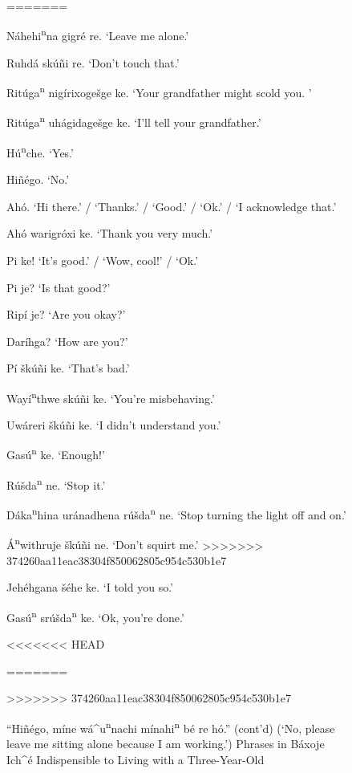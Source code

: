 \documentclass[output=paper]{LSP/langsci}
\begin{document}
\begin{figure}[p]
\begin{list}{}{}
=======
\item{N\'ahehi\textsuperscript{n}na gigr\'e re. `Leave me alone.'}
\item{Ruhd\'a sk\'u\~ni re. `Don't touch that.'}
\item{Rit\'uga\textsuperscript{n} nig\'irixoge\v{s}ge ke. `Your grandfather might scold you. '}
\item{Rit\'uga\textsuperscript{n} uh\'agidage\v{s}ge ke. `I'll tell your grandfather.'}
\item{}
\item{H\'u\textsuperscript{n}che.	`Yes.'}
\item{Hi\~n\'ego. `No.'}
\item{Ah\'o.	`Hi there.' / `Thanks.' / `Good.' / `Ok.' / `I acknowledge that.'}
\item{Ah\'o warigróxi ke. `Thank you very much.'}
\item{Pi ke! `It's good.' / `Wow, cool!' / `Ok.'}
\item{Pi je? `Is that good?'}
\item{Rip\'i je? `Are you okay?'}
\item{Dar\'ihga? `How are you?'}
\item{P\'i \v{s}k\'u\~ni ke. `That's bad.'}
\item{Way\'i\textsuperscript{n}thwe sk\'u\~ni ke. `You're misbehaving.'}
\item{Uw\'areri \v{s}k\'u\~ni ke. `I didn't understand you.'}
\item{Gas\'u\textsuperscript{n} ke. `Enough!'}
\item{R\'u\v{s}da\textsuperscript{n} ne. `Stop it.'}
\item{D\'aka\textsuperscript{n}hina ur\'anadhena r\'u\v{s}da\textsuperscript{n} ne. `Stop turning the light off and on.'}
\item{\'A\textsuperscript{n}withruje šk\'u\~ni ne. `Don't squirt me.'}
>>>>>>> 374260aa11eac38304f850062805c954c530b1e7
\item{}
\item{Jeh\'ehgana \v{s}\'ehe ke. `I told you so.'}
\item{Gas\'u\textsuperscript{n} sr\'u\v{s}da\textsuperscript{n} ke. `Ok, you're done.'}
\end{list} 
<<<<<<< HEAD
\caption{``Hiñ\'ego, míne wá\^{ }u\textsuperscript{n}nachi mínahi\textsuperscript{n} b\'e re hó.'' (cont'd)\newline
(`No, please leave me sitting alone because I am working.')\newline
Phrases in Báxoje Ich\^{ }\'e Indispensible to Living with a Three-Year-Old}
=======
\caption{``Hi\~n\'ego, m\'ine w\'a\^{ }u\textsuperscript{n}nachi m\'inahi\textsuperscript{n} b\'e re h\'o.'' (cont'd)\newline
(`No, please leave me sitting alone because I am working.')\newline
Phrases in B\'axoje Ich\^{ }\'e Indispensible to Living with a Three-Year-Old}
>>>>>>> 374260aa11eac38304f850062805c954c530b1e7
\label{phraselist4}
\end{figure}
\FloatBarrier
\end{document}
